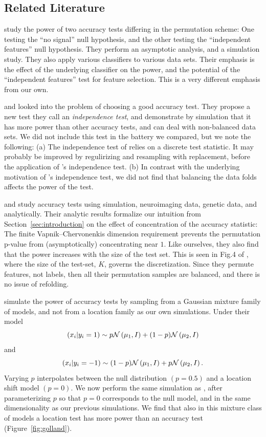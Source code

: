 \documentclass[12pt,a4paper]{article}
\begin{document}
\subsection{Related Literature}
\cite{ojala_permutation_2010} study the power of two accuracy tests differing in the permutation scheme:
One testing the ``no signal'' null hypothesis, and the other testing the ``independent features'' null hypothesis. 
They perform an asymptotic analysis, and a simulation study. 
They also apply various classifiers to various data sets. 
Their emphasis is the effect of the underlying classifier on the power, and the potential of the ``independent features'' test for feature selection.
This is a very different emphasis from our own.


\cite{olivetti_induction_2012} and \cite{olivetti_statistical_2014} looked into the problem of choosing a good accuracy test. 
They propose a new test they call an \emph{independence test}, and demonstrate by simulation that it has more power than other accuracy tests, and can deal with non-balanced data sets. 
We did not include this test in the battery we compared, but we note the following: 
(a) The independence test of \cite{olivetti_induction_2012} relies on a discrete test statistic. 
It may probably be improved by regulirizing and resampling with replacement, before the application of \cite{olivetti_induction_2012}'s independence test. 
(b) In contrast with the underlying motivation of \cite{olivetti_induction_2012}'s independence test, we did not find that balancing the data folds affects the power of the test. 


\cite{golland_permutation_2003} and \cite{golland_permutation_2005} study accuracy tests using simulation, neuroimaging data, genetic data, and analytically.
Their analytic results formalize our intuition from Section~\ref{sec:introduction} on the effect of concentration of the accuracy statistic:
The finite Vapnik–Chervonenkis dimension requirement \citep[Sec 4.3]{golland_permutation_2005} prevents the permutation p-value from (asymptotically) concentrating near $1$. 
Like ourselves, they also find that the power increases with the size of the test set. 
This is seen in Fig.4 of \citet{golland_permutation_2005}, where the size of the test-set, $K$, governs the discretization. 
Since they permute features, not labels, then all their permutation samples are balanced, and there is no issue of refolding. 

\cite{golland_permutation_2005} simulate the power of accuracy tests by sampling from a Gaussian mixture family of models, and not from a location family as our own simulations. 
Under their model 
$$(x_i|y_i=1) \sim p \mathcal{N}\left(\mu_1,I\right)+ (1-p) \mathcal{N}\left(\mu_2,I\right)$$ 
and 
$$(x_i|y_i=-1) \sim (1-p) \mathcal{N}\left(\mu_1,I\right)+ p \mathcal{N}\left(\mu_2,I\right).$$
Varying $p$ interpolates between the null distribution $(p=0.5)$ and a location shift model $(p=0)$. 
We now perform the same simulation as \cite{golland_permutation_2005}, after parameterizing $p$ so that $p=0$ corresponds to the null model, and in the same dimensionality as our previous simulations.
We find that also in this mixture class of models a location test has more power than an accuracy test (Figure~\ref{fig:golland}).
\end{document}
